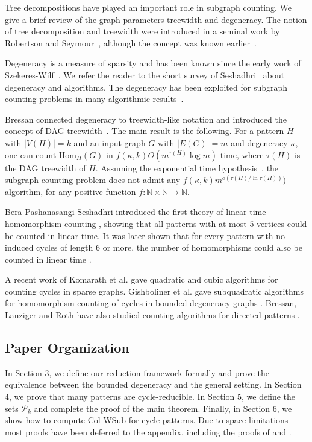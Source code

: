 \documentclass[a4paper,UKenglish,cleveref, autoref, numberwithinsect, thm-restate]{lipics-v2021}
\newcommand{\Hom}[2]{\mathrm{Hom}_{#2}(#1)}
\newcommand{\degen}{\kappa}
\newcommand{\dtw}{\tau}
\newcommand{\cP}{\mathcal{P}}
\begin{document}
	Tree decompositions have played an important role in subgraph counting.
	We give a brief review of the graph parameters treewidth and degeneracy.
	The notion of tree decomposition and treewidth were introduced in a seminal work by Robertson and Seymour~\cite{RoSe83,RoSe84,RoSe86}, although the concept
	was known earlier~\cite{BeBr73,Ha76}.
	
	Degeneracy is a measure of sparsity and has
	been known since the early work of Szekeres-Wilf~\cite{SzWi68}.
	We refer the reader to the short survey of Seshadhri~\cite{Se23} about degeneracy
	and algorithms. The 
	degeneracy has been exploited for subgraph counting problems in many
	algorithmic results~\cite{ChNi85,Ep94,AhNeRo+15,JhSePi15,PiSeVi17,OrBr17,JaSe17,PaSe20}.
	
	Bressan connected degeneracy to treewidth-like notation and introduced
	the concept of DAG treewidth~\cite{Br19, Br21}. 
	The main result is the following. For a pattern $H$ with $|V(H)|=k$ and 
	an input graph $G$ with $|E(G)|=m$ and degeneracy $\degen$,
	one can count $\Hom{G}{H}$ in
	$f(\degen,k)O(m^{\dtw(H)}\log m)$ time, where $\dtw(H)$ is the 
	DAG treewidth of $H$. Assuming the exponential time hypothesis~\cite{ImPaZa98}, the subgraph counting problem does not admit
	any $f(\degen,k)m^{o(\dtw(H)/\ln \dtw(H))})$ algorithm, for any positive function $f:\mathbb{N}\times \mathbb{N} \rightarrow \mathbb{N}$.
	
	Bera-Pashanasangi-Seshadhri introduced the first theory of linear time homomorphism
	counting \cite{BePaSe20}, showing that all patterns with at most $5$ vertices could be counted in linear time. It was later shown that for every pattern with no induced cycles of length $6$ or more, the number of homomorphisms could also be counted in linear time \cite{BePaSe21,BeGiLe+22}.
	
	A recent work of Komarath et al. \cite{KoKuMi+23} gave quadratic and cubic algorithms for counting cycles in sparse graphs. Gishboliner et al. gave subquadratic algorithms for homomorphism counting of cycles in bounded degeneracy graphs \cite{GiLeSh+23}.
	Bressan, Lanziger and Roth have also studied counting algorithms for directed patterns \cite{BrLaRo23}.
	

	
	\subsection{Paper Organization}
	
	In Section $3$, we define our reduction framework formally and prove the equivalence between the bounded degeneracy and the general setting. In Section $4$,
    we prove that many patterns are cycle-reducible. In Section $5$, we define the sets $\cP_k$ and complete the proof of the main theorem. Finally, in Section $6$, we show how to compute Col-WSub for cycle patterns. Due to space limitations most proofs have been deferred to the appendix, including the proofs of  and .
	
\end{document}
